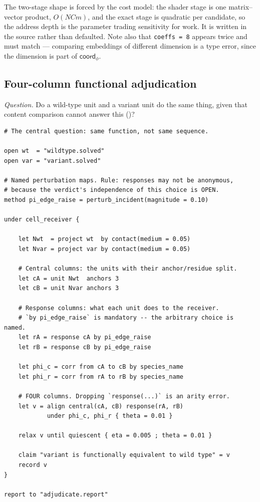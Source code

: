 \documentclass[11pt,twocolumn,a4paper]{article}
\theoremstyle{plain}
\theoremstyle{definition}
\theoremstyle{remark}
\newcommand{\typ}[1]{\ensuremath{\mathsf{#1}}}
\begin{document}
The two-stage shape is forced by the cost model: the shader stage is one
matrix--vector product, $O(NCm)$, and the exact stage is quadratic per
candidate, so the address depth is the parameter trading sensitivity for
work. It is written in the source rather than defaulted. Note also that
\texttt{coeffs = 8} appears twice and must match --- comparing
embeddings of different dimension is a type error, since the dimension
is part of \typ{coord}$_\phi$.

\subsection{Four-column functional adjudication}
\label{sec:prog-fourcol}

\emph{Question.} Do a wild-type unit and a variant unit do the same
thing, given that content comparison cannot answer this
()?

\begin{lstlisting}[caption={\texttt{adjudicate.syp}}]
# The central question: same function, not same sequence.

open wt  = "wildtype.solved"
open var = "variant.solved"

# Named perturbation maps. Rule: responses may not be anonymous,
# because the verdict's independence of this choice is OPEN.
method pi_edge_raise = perturb_incident(magnitude = 0.10)

under cell_receiver {

    let Nwt  = project wt  by contact(medium = 0.05)
    let Nvar = project var by contact(medium = 0.05)

    # Central columns: the units with their anchor/residue split.
    let cA = unit Nwt  anchors 3
    let cB = unit Nvar anchors 3

    # Response columns: what each unit does to the receiver.
    # `by pi_edge_raise` is mandatory -- the arbitrary choice is named.
    let rA = response cA by pi_edge_raise
    let rB = response cB by pi_edge_raise

    let phi_c = corr from cA to cB by species_name
    let phi_r = corr from rA to rB by species_name

    # FOUR columns. Dropping `response(...)` is an arity error.
    let v = align central(cA, cB) response(rA, rB)
            under phi_c, phi_r { theta = 0.01 }

    relax v until quiescent { eta = 0.005 ; theta = 0.01 }

    claim "variant is functionally equivalent to wild type" = v
    record v
}

report to "adjudicate.report"
\end{lstlisting}
\end{document}

